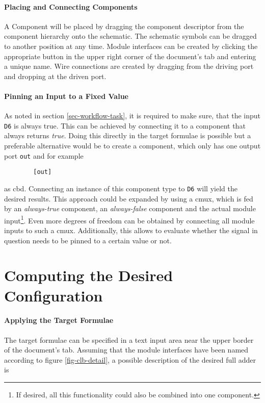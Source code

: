 	\paragraph{Placing and Connecting Components}
	A Component will be placed by dragging the component descriptor from the component hierarchy onto the schematic.
	The schematic symbols can be dragged to another position 	at any time.
	Module interfaces can be created by clicking the appropriate button in the upper right corner of the document's tab and entering a unique name.
	Wire connections are created by dragging from the driving port and dropping at the driven port.
	 
	\paragraph{Pinning an Input to a Fixed Value}
	As noted in section \ref{sec-workflow-task}, it is required to make sure, that the input \texttt{D6} is always true.
	This can be achieved by connecting it to a component that always returns \emph{true}.
	Doing this directly in the target formulae is possible but a preferable alternative would be to create a component, which only has one output port \texttt{out} and for example

	\begin{verbatim}
		[out]
	\end{verbatim}
	
	as \gls{cbd}.
	Connecting an instance of this component type to \texttt{D6} will yield the desired results.
	This approach could be expanded by using a \gls{cmux}, which is fed by an \emph{always-true} component, an \emph{always-false} component and the actual module input\footnote{
		If desired, all this functionality could also be combined into one component.	
	}.
	Even more degrees of freedom can be obtained by connecting all module inputs to such a \gls{cmux}.
	Additionally, this allows to evaluate whether the signal in question needs to be pinned to a certain value or not.
	
\section{Computing the Desired Configuration}

	\paragraph{Applying the Target Formulae}
	The target formulae can be specified in a text input area near the upper border of the document's tab.
	Assuming that the module interfaces have been named according to figure \ref{fig-clb-detail}, a possible description of the desired full adder is
	
